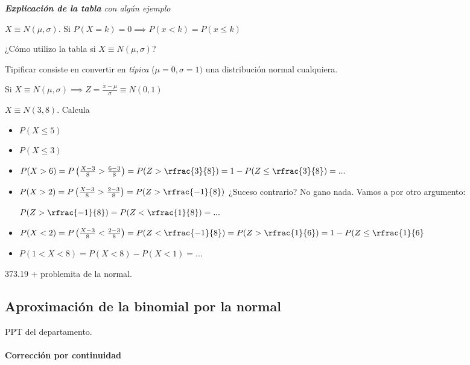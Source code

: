 \textit{\textbf{Explicación de la tabla} con algún ejemplo}

\obs $X\equiv N(\mu,\sigma)$. Si $P(X=k) = 0 \implies P(x<k) = P(x\leq k)$

\obs ¿Cómo utilizo la tabla si $X\equiv N(\mu,\sigma)$? 

\begin{defn}[Tipificación]
Tipificar consiste en convertir en \textit{típica} ($\mu=0,\sigma=1)$ una distribución normal cualquiera.

Si $X\equiv N(\mu,\sigma) \implies Z = \displaystyle\frac{x-\mu}{\sigma} \equiv N(0,1)$
\end{defn}

\begin{example} $X\equiv N(3,8)$. Calcula
\begin{itemize}
    \item $P(X\leq 5)$
    \item $P(X\leq 3)$
    \item $P(X>6) = P\left(\frac{X-3}{8} > \frac{6-3}{8}\right) = P(Z>\rfrac{3}{8}) = 1-P(Z\leq\rfrac{3}{8}) = ... $
    \item $P(X>2) = P\left(\frac{X-3}{8} > \frac{2-3}{8}\right) = P(Z>\rfrac{-1}{8})$ ¿Suceso contrario? No gano nada. Vamos a por otro argumento: 
    
    $P(Z>\rfrac{-1}{8}) = P(Z<\rfrac{1}{8}) = ...$
    \item $P(X<2) =  P\left(\frac{X-3}{8} < \frac{2-3}{8}\right) = P(Z<\rfrac{-1}{8}) = P(Z>\rfrac{1}{6}) = 1-P(Z\leq \rfrac{1}{6}
    $
    \item $P(1<X<8) = P(X<8) - P(X<1) = ...$
\end{itemize}
373.19 + problemita de la normal.

\subsection{Aproximación de la binomial por la normal}
PPT del departamento.

\paragraph{Corrección por continuidad}

\end{example}
